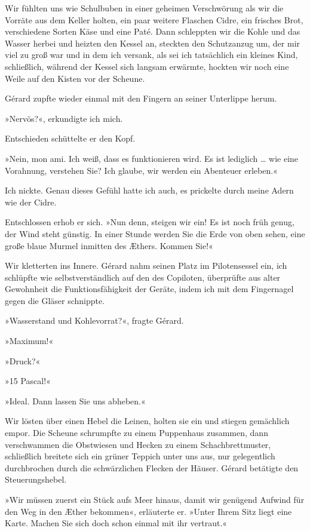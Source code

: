 Wir fühlten uns wie Schulbuben in einer geheimen Verschwörung als
wir die Vorräte aus dem Keller holten, ein paar weitere Flaschen
Cidre, ein frisches Brot, verschiedene Sorten Käse und eine Paté.
Dann schleppten wir die Kohle und das Wasser herbei und heizten den
Kessel an, steckten den Schutzanzug um, der mir viel zu groß war
und in dem ich versank, als sei ich tatsächlich ein kleines Kind,
schließlich, während der Kessel sich langsam erwärmte, hockten wir
noch eine Weile auf den Kisten vor der Scheune.

Gérard zupfte wieder einmal mit den Fingern an seiner Unterlippe
herum.

»Nervös?«, erkundigte ich mich.

Entschieden schüttelte er den Kopf.

»Nein, mon ami. Ich weiß, dass es funktionieren wird. Es ist
lediglich \ldots{} wie eine Vorahnung, verstehen Sie? Ich glaube, wir
werden ein Abenteuer erleben.«

Ich nickte. Genau dieses Gefühl hatte ich auch, es prickelte durch
meine Adern wie der Cidre.

Entschlossen erhob er sich. »Nun denn, steigen wir ein! Es ist noch
früh genug, der Wind steht günstig. In einer Stunde werden Sie die
Erde von oben sehen, eine große blaue Murmel inmitten des Æthers.
Kommen Sie!«

\bigpar

Wir kletterten ins Innere. Gérard nahm seinen Platz im
Pilotensessel ein, ich schlüpfte wie selbstverständlich auf den des
Copiloten, überprüfte aus alter Gewohnheit die Funktionsfähigkeit
der Geräte, indem ich mit dem Fingernagel gegen die Gläser
schnippte.

»Wasserstand und Kohlevorrat?«, fragte Gérard.

»Maximum!«

»Druck?«

»15 Pascal!«

»Ideal. Dann lassen Sie uns abheben.«

Wir lösten über einen Hebel die Leinen, holten sie ein und stiegen
gemächlich empor. Die Scheune schrumpfte zu einem Puppenhaus
zusammen, dann verschwammen die Obstwiesen und Hecken zu einem
Schachbrettmuster, schließlich breitete sich ein grüner Teppich
unter uns aus, nur gelegentlich durchbrochen durch die
schwärzlichen Flecken der Häuser. Gérard betätigte den
Steuerungshebel.

»Wir müssen zuerst ein Stück aufs Meer hinaus, damit wir genügend
Aufwind für den Weg in den Æther bekommen«, erläuterte er. »Unter
Ihrem Sitz liegt eine Karte. Machen Sie sich doch schon einmal mit
ihr vertraut.«

